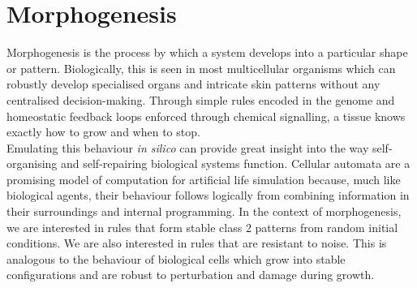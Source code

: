 \section{Morphogenesis}
Morphogenesis is the process by which a system develops into a particular shape or pattern. 
Biologically, this is seen in most multicellular organisms which can robustly develop specialised organs and intricate skin patterns without any centralised decision-making.
Through simple rules encoded in the genome and homeostatic feedback loops enforced through chemical signalling, a tissue knows exactly how to grow and when to stop.\\

Emulating this behaviour \textit{in silico} can provide great insight into the way self-organising and self-repairing biological systems function.
Cellular automata are a promising model of computation for artificial life simulation because, much like biological agents, their behaviour follows logically from combining information in their surroundings and internal programming.
In the context of morphogenesis, we are interested in rules that form stable class 2 patterns from random initial conditions.
We are also interested in rules that are resistant to noise.
This is analogous to the behaviour of biological cells which grow into stable configurations and are robust to perturbation and damage during growth.



